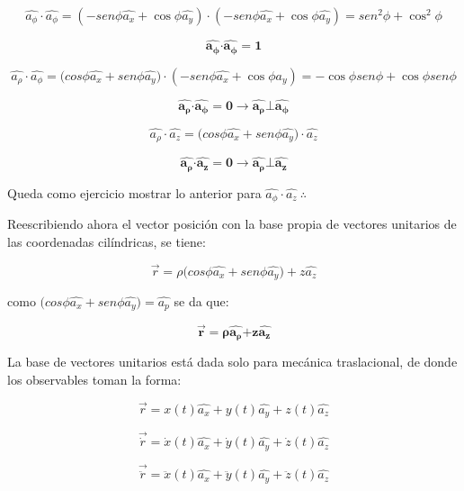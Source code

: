 \documentclass[]{article}
\begin{document}
\[\widehat{a_{\phi}} \cdot \widehat{a_{\phi}} = \left( - {sen}\phi\widehat{a_{x}} + \cos\phi\widehat{a_{y}} \right) \cdot \left( - {sen}\phi\widehat{a_{x}} + \cos\phi\widehat{a_{y}} \right) = {sen}^{2}\phi + \cos^{2}\phi\]

\[\widehat{\mathbf{a}_{\mathbf{\phi}}}\mathbf{\cdot}\widehat{\mathbf{a}_{\mathbf{\phi}}}\mathbf{= 1}\]

\[\widehat{a_{\rho}} \cdot \widehat{a_{\phi}} = {(cos}\phi\widehat{a_{x}} + {sen}\phi\widehat{a_{y}}) \cdot \left( - {sen}\phi\widehat{a_{x}} + \cos\phi\widehat{a_{y}} \right) = - \cos\phi{sen}{\phi +}\cos\phi{sen}\phi\]

\[\widehat{\mathbf{a}_{\mathbf{\rho}}}\mathbf{\cdot}\widehat{\mathbf{a}_{\mathbf{\phi}}}\mathbf{= 0 \rightarrow}\widehat{\mathbf{a}_{\mathbf{\rho}}}\mathbf{\bot}\widehat{\mathbf{a}_{\mathbf{\phi}}}\]

\[\widehat{a_{\rho}} \cdot \widehat{a_{z}} = {(cos}\phi\widehat{a_{x}} + {sen}\phi\widehat{a_{y}}) \cdot \widehat{a_{z}}\]

\[\widehat{\mathbf{a}_{\mathbf{\rho}}}\mathbf{\cdot}\widehat{\mathbf{a}_{\mathbf{z}}}\mathbf{= 0 \rightarrow}\widehat{\mathbf{a}_{\mathbf{\rho}}}\mathbf{\bot}\widehat{\mathbf{a}_{\mathbf{z}}}\]

Queda como ejercicio mostrar lo anterior para
\(\widehat{a_{\phi}} \cdot \widehat{a_{z}}\ \therefore\ \)

Reescribiendo ahora el vector posición con la base propia de vectores
unitarios de las coordenadas cilíndricas, se tiene:

\[\overrightarrow{r} = {\rho(cos}\phi\widehat{a_{x}} + {sen}\phi\widehat{a_{y}}) + z\widehat{a_{z}}\]

como
\({(cos}\phi\widehat{a_{x}} + {sen}\phi\widehat{a_{y}}) = \widehat{a_{p}}\)
se da que:

\[\overrightarrow{\mathbf{r}}\mathbf{= \rho}\widehat{\mathbf{a}_{\mathbf{\rho}}}\mathbf{+}\mathbf{z}\widehat{\mathbf{a}_{\mathbf{z}}}\]

La base de vectores unitarios está dada solo para mecánica traslacional,
de donde los observables toman la forma:

\[\overrightarrow{r} = x(t)\widehat{a_{x}} + y(t)\widehat{a_{y}} + z(t)\widehat{a_{z}}\]

\[\overrightarrow{\dot{r}} = \dot{x}(t)\widehat{a_{x}} + \dot{y}(t)\widehat{a_{y}} + \dot{z}(t)\widehat{a_{z}}\]

\[\overrightarrow{\ddot{r}} = \ddot{x}(t)\widehat{a_{x}} + \ddot{y}(t)\widehat{a_{y}} + \ddot{z}(t)\widehat{a_{z}}\]
\end{document}
